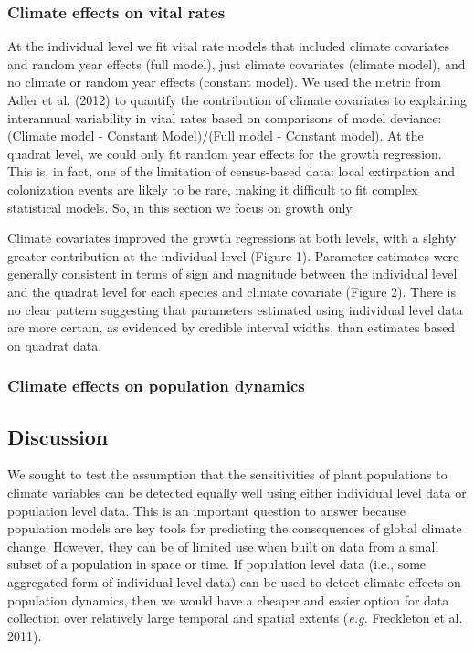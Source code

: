 \documentclass[12pt,]{article}
\begin{document}
\subsubsection{Climate effects on vital
rates}\label{climate-effects-on-vital-rates}

At the individual level we fit vital rate models that included climate
covariates and random year effects (full model), just climate covariates
(climate model), and no climate or random year effects (constant model).
We used the metric from Adler et al. (2012) to quantify the contribution
of climate covariates to explaining interannual variability in vital
rates based on comparisons of model deviance: (Climate model - Constant
Model)/(Full model - Constant model). At the quadrat level, we could
only fit random year effects for the growth regression. This is, in
fact, one of the limitation of census-based data: local extirpation and
colonization events are likely to be rare, making it difficult to fit
complex statistical models. So, in this section we focus on growth only.

Climate covariates improved the growth regressions at both levels, with
a slghty greater contribution at the individual level (Figure 1).
Parameter estimates were generally consistent in terms of sign and
magnitude between the individual level and the quadrat level for each
species and climate covariate (Figure 2). There is no clear pattern
suggesting that parameters estimated using individual level data are
more certain, as evidenced by credible interval widths, than estimates
based on quadrat data.

\subsubsection{Climate effects on population
dynamics}\label{climate-effects-on-population-dynamics}

\subsection{Discussion}\label{discussion}

We sought to test the assumption that the sensitivities of plant
populations to climate variables can be detected equally well using
either individual level data or population level data. This is an
important question to answer because population models are key tools for
predicting the consequences of global climate change. However, they can
be of limited use when built on data from a small subset of a population
in space or time. If population level data (i.e., some aggregated form
of individual level data) can be used to detect climate effects on
population dynamics, then we would have a cheaper and easier option for
data collection over relatively large temporal and spatial extents
(\emph{e.g.} Freckleton et al. 2011).
\end{document}
